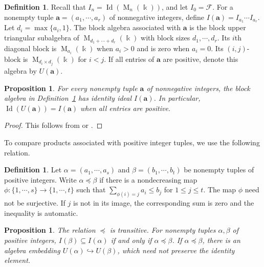 \documentclass[11pt,reqno]{amsart}
\newcommand{\kk}{\Bbbk}
\newcommand{\F}{\mathcal F}
\newcommand{\Id}{\operatorname{Id}}
\newcommand{\Mat}{\operatorname{M}}
\newtheorem{proposition}[theorem]{Proposition}
\theoremstyle{definition}
\newtheorem{definition}[theorem]{Definition}
\theoremstyle{remark}
\numberwithin{equation}{section}
\begin{document}
\begin{definition}\label{def:chain-blocks}
Recall that $I_n=\Id(\Mat_n(\kk))$, and
let $I_0=\F$. For a nonempty tuple
$\mathbf a=(a_1,\cdots,a_r)$ of nonnegative integers, define
$
 I(\mathbf a)=I_{a_1}\cdots I_{a_r}$.
Let $d_i=\max\{a_i,1\}$.
The block algebra associated with $\mathbf a$ is the block upper
triangular subalgebra of $\Mat_{d_1+\cdots+d_r}(\kk)$ with
block sizes $d_1,\cdots,d_r$. Its $i$th diagonal block is
$\Mat_{a_i}(\kk)$ when $a_i>0$ and is zero when $a_i=0$.
Its $(i,j)$-block is $\Mat_{d_i\times d_j}(\kk)$ for $i<j$.
If all entries of $\mathbf a$ are positive, denote this algebra
by $U(\mathbf a)$.
\end{definition}

\begin{proposition}\label{prop:chain-block-identities}
For every nonempty tuple $\mathbf a$ of nonnegative integers,
the block algebra in Definition~\ref{def:chain-blocks} has
identity ideal $I(\mathbf a)$.
In particular, $\Id(U(\mathbf a))=I(\mathbf a)$ when all entries
are positive.
\end{proposition}

\begin{proof}
This follows from 
\cite[Theorem~1]{Lewin1974} or
\cite[Theorem~1.1]{Berele2012}.
\end{proof}

To compare products associated with positive integer
tuples, we use the following relation.

\begin{definition}\label{def:chain-order}
Let $\alpha=(a_1,\cdots,a_s)$ and
$\beta=(b_1,\cdots,b_t)$ be nonempty tuples of
positive integers. Write $\alpha\preceq\beta$ if
there is a nondecreasing map
$\phi:\{1,\cdots,s\}\to\{1,\cdots,t\}$ such that
$
\sum_{\phi(i)=j}a_i\leq b_j$
for $1\leq j\leq t$.
The map $\phi$ need not be surjective.
If $j$ is not in its image, the corresponding sum
is zero and the inequality is automatic.
\end{definition}

\begin{proposition}\label{prop:single-chain}
The relation $\preceq$ is transitive.
For nonempty tuples $\alpha,\beta$ of positive integers,
$
 I(\beta)\subseteq I(\alpha)
$ if and only if $
 \alpha\preceq\beta$.
If $\alpha\preceq\beta$, there is an algebra embedding
$U(\alpha)\hookrightarrow U(\beta)$, which need not preserve
the identity element.
\end{proposition}
\end{document}
